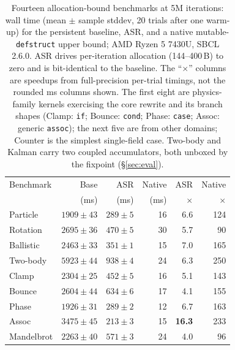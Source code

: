 \documentclass[sigplan,screen,review,anonymous]{acmart}
\begin{document}
\begin{table}
  \caption{Fourteen allocation-bound benchmarks at 5M iterations: wall time
  (mean $\pm$ sample stddev, 20 trials after one warm-up) for the
  persistent baseline, ASR, and a native
  mutable-\texttt{defstruct} upper bound; AMD Ryzen 5 7430U, SBCL 2.6.0. ASR
  drives per-iteration allocation (144--400\,B) to zero and is bit-identical
  to the baseline. The ``$\times$'' columns are speedups from
  full-precision per-trial timings, not the rounded ms columns shown.
  The first eight are physics-family kernels exercising the core rewrite
  and its branch shapes (Clamp: \texttt{if}; Bounce: \texttt{cond}; Phase:
  \texttt{case}; Assoc: generic \texttt{assoc}); the next five are from
  other domains; Counter is the simplest single-field case. Two-body and
  Kalman carry two coupled accumulators, both unboxed by the fixpoint
  (\S\ref{sec:eval}).}
  \label{tab:speedup}
  \small
  \begin{tabular}{lrrrrr}
    \toprule
    Benchmark & Base & ASR & Native & ASR & Native \\
              & (ms) & (ms) & (ms) & $\times$ & $\times$ \\
    \midrule
    Particle   & $1909\pm43$ & \phantom{0}$289\pm5$\phantom{0}\phantom{0}  & \phantom{0}16 & \phantom{0}6.6 & 124 \\
    Rotation   & $2695\pm36$ & \phantom{0}$470\pm5$\phantom{0}\phantom{0}  & \phantom{0}30 & \phantom{0}5.7 & \phantom{0}90 \\
    Ballistic  & $2463\pm33$ & \phantom{0}$351\pm1$\phantom{0}\phantom{0}  & \phantom{0}15 & \phantom{0}7.0 & 165 \\
    Two-body   & $5923\pm44$ & \phantom{0}$938\pm4$\phantom{0}\phantom{0} & \phantom{0}24 & \phantom{0}6.3 & 250 \\
    Clamp      & $2304\pm25$ & \phantom{0}$452\pm5$\phantom{0}\phantom{0}  & \phantom{0}16 & \phantom{0}5.1 & 143 \\
    Bounce     & $2604\pm44$ & \phantom{0}$634\pm6$\phantom{0}\phantom{0}  & \phantom{0}17 & \phantom{0}4.1 & 155 \\
    Phase      & $1926\pm31$ & \phantom{0}$289\pm2$\phantom{0}\phantom{0}  & \phantom{0}12 & \phantom{0}6.7 & 163 \\
    Assoc      & $3475\pm45$ & \phantom{0}$213\pm3$\phantom{0}\phantom{0}  & \phantom{0}15 & \textbf{16.3} & 233 \\
    \midrule
    Mandelbrot & $2263\pm40$ & \phantom{0}$571\pm3$\phantom{0}\phantom{0}  & \phantom{0}24 & \phantom{0}4.0 & \phantom{0}96 \\

\end{tabular}
\end{table}
\end{document}
